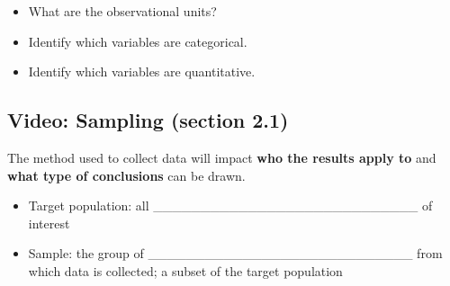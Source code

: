 \documentclass[
]{report}
\newenvironment{Shaded}{\begin{snugshade}}{\end{snugshade}}
\newcommand{\CommentTok}[1]{\textcolor[rgb]{0.56,0.35,0.01}{\textit{#1}}}
\providecommand{\tightlist}{%
  \setlength{\itemsep}{0pt}\setlength{\parskip}{0pt}}
\begin{document}
\begin{Shaded}
\end{Shaded}

\begin{itemize}
\tightlist
\item
  What are the observational units?
\end{itemize}

\vspace{0.2in}

\begin{itemize}
\tightlist
\item
  Identify which variables are categorical.
\end{itemize}

\vspace{0.2in}

\begin{itemize}
\tightlist
\item
  Identify which variables are quantitative.
\end{itemize}

\vspace{0.2in}

\subsection*{Video: Sampling (section 2.1)}\label{video-sampling-section-2.1}


The method used to collect data will impact \textbf{who the results apply to} and \textbf{what type of conclusions} can be drawn.

\begin{itemize}
\item
  Target population: all \_\_\_\_\_\_\_\_\_\_\_\_\_\_\_\_\_\_\_\_\_\_\_\_\_\_\_\_ of interest
\item
  Sample: the group of \_\_\_\_\_\_\_\_\_\_\_\_\_\_\_\_\_\_\_\_\_\_\_\_\_\_\_\_ from which data is collected; a subset of the target population
\end{itemize}
\end{document}
